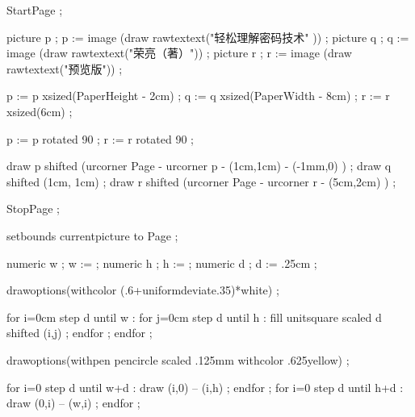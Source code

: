 \stopuseMPgraphic


    StartPage ;


        picture p ; p := image (draw rawtextext("\darkred 轻松理解密码技术"   )) ;
        picture q ; q := image (draw rawtextext("\darkred{}荣亮（著）")) ;
        picture r ; r := image (draw rawtextext("\darkred{}预览版")) ;

        p := p xsized(PaperHeight - 2cm) ;
        q := q xsized(PaperWidth  - 8cm) ;
        r := r xsized(6cm) ;

        p := p rotated 90 ;
        r := r rotated 90 ;

        draw p shifted (urcorner Page - urcorner p - (1cm,1cm) - (-1mm,0) ) ;
        draw q shifted (1cm, 1cm) ;
        draw r shifted (urcorner Page - urcorner r - (5cm,2cm) ) ;

    StopPage ;

    setbounds currentpicture to Page ;

\stopuseMPgraphic



\stopuseMPgraphic


    numeric w ; w := \overlaywidth ;
    numeric h ; h := \overlayheight ;
    numeric d ; d := .25cm ;

    drawoptions(withcolor (.6+uniformdeviate.35)*white) ;

    for i=0cm step d until w  :
        for j=0cm step d until h :
            fill unitsquare scaled d shifted (i,j) ;
        endfor ;
    endfor ;

    drawoptions(withpen pencircle scaled .125mm withcolor .625yellow) ;

    for i=0 step d until w+d : draw (i,0) -- (i,h) ; endfor ;
    for i=0 step d until h+d : draw (0,i) -- (w,i) ; endfor ;

\stopuseMPgraphic


\startnotmode[proof]
\stopnotmode


